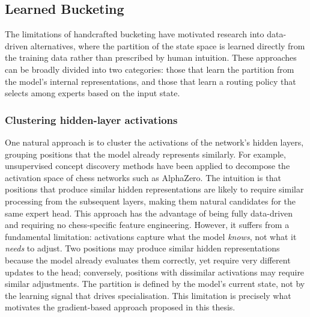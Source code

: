\subsection{Learned Bucketing}

The limitations of handcrafted bucketing have motivated research into data-driven alternatives, where the partition of the state space is learned directly from the training data rather than prescribed by human intuition. These approaches can be broadly divided into two categories: those that learn the partition from the model's internal representations, and those that learn a routing policy that selects among experts based on the input state.

\subsubsection{Clustering hidden-layer activations}
One natural approach is to cluster the activations of the network's hidden layers, grouping positions that the model already represents similarly. For example, unsupervised concept discovery methods have been applied to decompose the activation space of chess networks such as AlphaZero. The intuition is that positions that produce similar hidden representations are likely to require similar processing from the subsequent layers, making them natural candidates for the same expert head. This approach has the advantage of being fully data-driven and requiring no chess-specific feature engineering. However, it suffers from a fundamental limitation: activations capture what the model \emph{knows}, not what it \emph{needs} to adjust. Two positions may produce similar hidden representations because the model already evaluates them correctly, yet require very different updates to the head; conversely, positions with dissimilar activations may require similar adjustments. The partition is defined by the model's current state, not by the learning signal that drives specialisation. This limitation is precisely what motivates the gradient-based approach proposed in this thesis.

